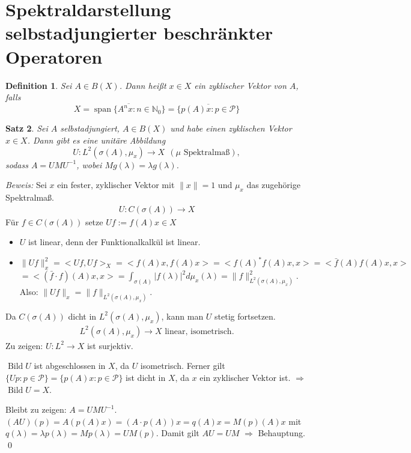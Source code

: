 \documentclass[12pt]{extreport} %
\newtheorem{Satz}{Satz}[subsection]
\newtheorem{Definition}[Satz]{Definition}
\DeclareMathOperator{\Bild}{Bild}
\DeclareMathOperator{\spann}{span}
\numberwithin{equation}{section}
\newcommand{\N}{\mathbb{N}} %
\newcommand{\m}{\cdot}
\newcommand{\Bew}{\emph{Beweis: }}
\begin{document}
	\section{Spektraldarstellung selbstadjungierter beschränkter Operatoren}
	
	\begin{Definition}
		Sei $A\in B(X)$. Dann heißt $x\in X$ ein zyklischer Vektor von $A$, falls
		$$X=\overline{\spann\{A^nx: n\in \N_0 \}} =\overline{\{p(A)x:p\in \mathcal{P} \}}$$
	\end{Definition}
	
	\begin{Satz}
		Sei $A$ selbstadjungiert, $A\in B(X)$ und habe einen zyklischen Vektor $x\in X$. Dann gibt es eine unitäre Abbildung 
		$$U: L^2(\sigma(A),\mu_x)\rightarrow  X ~~(\mu\text{ Spektralmaß}),$$
		sodass $A = UMU^{-1}$, wobei $Mg(\lambda) = \lambda g(\lambda)$.
	\end{Satz}
	
	\Bew Sei $x$ ein fester, zyklischer Vektor mit $\|x\| = 1$ und $\mu_x$ das zugehörige Spektralmaß.
	\begin{align*}
		U : C(\sigma(A))\rightarrow X
	\end{align*}
	Für $f\in C(\sigma(A))$ setze $U f:= f(A)x\in X$
	\begin{itemize}
		\item $U$ ist linear, denn der Funktionalkalkül ist linear.
		\item $\|Uf\|_x^2 = <Uf, Uf>_X = <f(A)x,f(A)x> = <f(A)^*f(A)x,x> = <\bar f(A)f(A)x,x> $ \\$=<(\bar f\m f)(A)x,x> = \int_{\sigma(A)} |f(\lambda)|^2d\mu_x(\lambda) = \|f\|_{L^2(\sigma(A),\mu_x)}^2$. Also: $\|Uf\|_x = \|f\|_{L^2(\sigma(A),\mu_x)}$.
	\end{itemize}
	Da $C(\sigma(A))$ dicht in $L^2(\sigma(A),\mu_x)$, kann man $U$ stetig fortsetzen.
	\begin{align*}
		L^2(\sigma(A),\mu_x) \rightarrow X \text{ linear, isometrisch.}
	\end{align*}
	Zu zeigen: $U:L^2\rightarrow X$ ist surjektiv.
	
	$\Bild U$ ist abgeschlossen in $X$, da $U$ isometrisch. Ferner gilt $\{Up: p\in \mathcal{P}\} = \{p(A)x: p\in \mathcal{P} \}$ ist dicht in $X$, da $x$ ein zyklischer Vektor ist. $\Rightarrow$ $\Bild U = X$. 
	
	Bleibt zu zeigen: $A = UMU^{-1}$. $(AU)(p) = A(p(A)x) = (A\m p(A))x = q(A)x = M(p)(A)x$ mit $q(\lambda) = \lambda p(\lambda) = M p(\lambda) = UM(p)$. Damit gilt $AU = UM$ $\Rightarrow$ Behauptung.
	\qed
	
\end{document}
